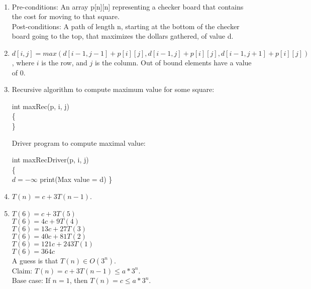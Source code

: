 \documentclass{assignment}
\begin{document}
\begin{problemlist}
\clearpage
\pbitem
\begin{problem}
\end{problem}
\begin{answer}
\\
\begin{enumerate}
\item
Pre-conditions: An array p[n][n] representing a checker board that contains the cost for moving to that square.\\
Post-conditions: A path of length n, starting at the bottom of the checker board going to the top, that maximizes the dollars gathered, of value d.
\item
$d[i,j] = max(d[i-1,j-1]+p[i][j], d[i-1,j]+p[i][j], d[i-1,j+1]+p[i][j])$, where $i$ is the row, and $j$ is the column. Out of bound elements have a value of $0$.
\item
Recursive algorithm to compute maximum value for some square:\\
\IncMargin{3em}
\begin{algorithm}
  int maxRec(p, i, j)\\\{\\
  \Indp
  \Indm
  \}
\end{algorithm}
\DecMargin{3em}
Driver program to compute maximal value:\\
\IncMargin{3em}
\begin{algorithm}
  int maxRecDriver(p, i, j)\\\{\\
  \Indp
  $d=-\infty$\;
  print(Max value = d)\;
  \Indm
  \}
\end{algorithm}
\DecMargin{3em}
\item
$T(n) = c + 3T(n-1)$.
\item
$T(6) = c + 3T(5)$\\
$T(6) = 4c + 9T(4)$\\
$T(6) = 13c + 27T(3)$\\
$T(6) = 40c + 81T(2)$\\
$T(6) = 121c + 243T(1)$\\
$T(6) = 364c$\\
A guess is that $T(n)\in O(3^n)$.\\
Claim: $T(n) = c + 3T(n-1) \le a*3^n$.\\
Base case: If $n = 1$, then $T(n) = c \le a*3^n$.\\

\end{enumerate}
\end{answer}
\end{problemlist}
\end{document}
